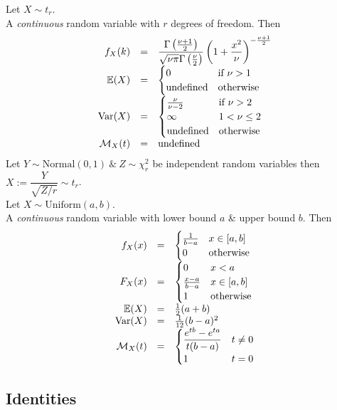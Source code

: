 \documentclass[11pt,a4paper]{article}
\begin{document}
Let $X\sim t_r$.\\
A \textit{continuous} random variable with $r$ degrees of freedom. Then
\[\begin{array}{rcll}
f_X(k)&=&{\displaystyle\frac{\Gamma\left(\frac{\nu+1}{2}\right)}{\sqrt{\nu\pi}\Gamma\left(\frac{\nu}{2}\right)}\left(1+\frac{x^2}{\nu}\right)^{-\frac{\nu+1}{2}}}\\
\mathbb{E}(X)&=&\begin{cases}0&\text{if }\nu>1\\\text{undefined}&\text{otherwise}\end{cases}\\
\mathrm{Var}(X)&=&\begin{cases}\frac{\nu}{\nu-2}&\text{if }\nu>2\\\infty&1<\nu\leq2\\\text{undefined}&\text{otherwise}\end{cases}\\
\mathcal{M}_X(t)&=&\text{undefined}
\end{array}\]
\nb Let $Y\sim\text{Normal}(0,1)\ \&\ Z\sim\chi^2_r$ be independent random variables then $X:=\dfrac{Y}{\sqrt{Z/r}}\sim t_r$.\\

Let $X\sim\text{Uniform}(a,b)$.\\
A \textit{continuous} random variable with lower bound $a$ \& upper bound $b$. Then
\[\begin{array}{rcll}
f_X(x)&=&\begin{cases}\frac{1}{b-a}&x\in[a,b]\\0&\text{otherwise}\end{cases}\\
F_X(x)&=&\begin{cases}0&x<a\\\frac{x-a}{b-a}&x\in[a,b]\\1&\text{otherwise}\end{cases}\\
\mathbb{E}(X)&=&\frac{1}{2}(a+b)\\
\mathrm{Var}(X)&=&\frac{1}{12}(b-a)^2\\
\mathcal{M}_X(t)&=&\begin{cases}\dfrac{e^{tb}-e^{ta}}{t(b-a)}&t\neq0\\1&t=0\end{cases}
\end{array}\]

\subsection{Identities}
\end{document}
